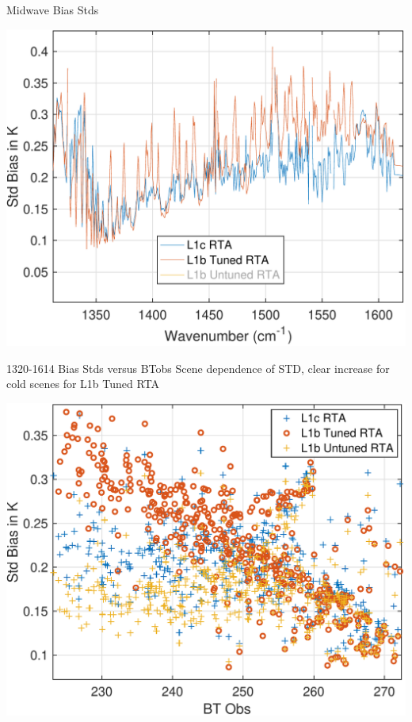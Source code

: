 \documentclass[10pt,t]{beamer}
\begin{document}
\begin{frame}[label={sec:org916b712},noframenumbering]{Midwave Bias Stds}
\begin{center}
\includegraphics[width=0.75\linewidth]{./Talk2/std_3rta_mw_nol1b untuned.pdf}
\end{center}
\end{frame}

\begin{frame}[label={sec:org8aa77db}]{1320-1614 \wn Bias Stds versus BTobs}
Scene dependence of STD, clear increase for cold scenes for L1b Tuned RTA
\begin{center}
\includegraphics[width=0.75\linewidth]{./Talk2/std_vs_btobs_1320-1614.pdf}
\end{center}
\end{frame}
\end{document}
